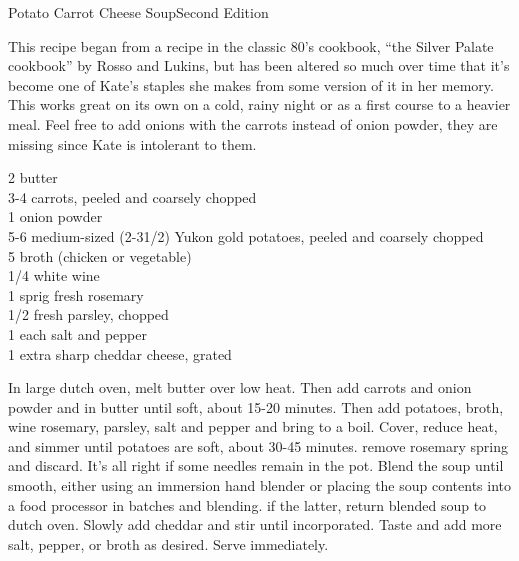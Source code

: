 \begin{entry}{Potato Carrot Cheese Soup}{Second Edition}

\begin{open}
  This recipe began from a recipe in the classic 80's cookbook, ``the Silver
  Palate cookbook'' by Rosso and Lukins, but has been altered so much over
  time that it's become one of Kate's staples she makes from some version of
  it in her memory. This works great on its own on a cold, rainy night or as a
  first course to a heavier meal. Feel free to add onions with the carrots
  instead of onion powder, they are missing since Kate is intolerant to them.
\end{open}
\begin{ingredients}
    \SI{2}{\tblspoon} butter\\
    3-4 carrots, peeled and coarsely chopped\\
    \SI{1}{\teaspoon} onion powder\\
    5-6 medium-sized (2-3\SI{1/2}{\pound}) Yukon gold potatoes, peeled and
    coarsely chopped \\
    \SI{5}{\cup} broth (chicken or vegetable)\\
    \SI{1/4}{\cup} white wine \\
    1 sprig fresh rosemary \\
    \SI{1/2}{\cup} fresh parsley, chopped\\
    \SI{1}{\teaspoon} each salt and pepper\\
    \SI{1}{\cup} extra sharp cheddar cheese, grated
\end{ingredients}
In large dutch oven, melt butter over low heat. Then add carrots and onion
powder and \saute in butter until soft, about 15-20 minutes. Then add potatoes,
broth, wine rosemary, parsley, salt and pepper and bring to a boil. Cover,
reduce heat, and simmer until potatoes are soft, about 30-45 minutes. remove
rosemary spring and discard. It's all right if some needles remain in the
pot. Blend the soup until smooth, either using an immersion hand blender or
placing the soup contents into a food processor in batches and blending. if
the latter, return blended soup to dutch oven. Slowly add cheddar and stir
until incorporated. Taste and add more salt, pepper, or broth as
desired. Serve immediately.
\end{entry}

